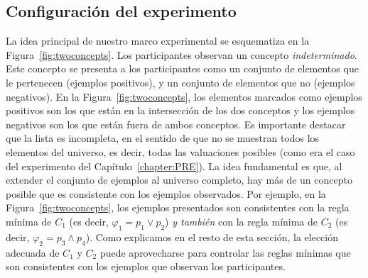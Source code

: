 \subsection{Configuración del experimento}\label{Subsec:ExperimentFlow}
La idea principal de nuestro marco experimental se esquematiza en la Figura~\ref{fig:twoconcepts}. Los participantes observan un concepto \textit{indeterminado}. Este concepto se presenta a los participantes como un conjunto de elementos que le pertenecen (ejemplos positivos), y un conjunto de elementos que no (ejemplos negativos). En la Figura~\ref{fig:twoconcepts}, los elementos marcados como ejemplos positivos son los que están en la intersección de los dos conceptos y los ejemplos negativos son los que están fuera de ambos conceptos. Es importante destacar que la lista es incompleta, en el sentido de que no se muestran todos los elementos del universo, es decir, todas las valuaciones posibles (como era el caso del experimento del Capítulo~\ref{chapter:PRE}). La idea fundamental es que, al extender el conjunto de ejemplos al universo completo, hay más de un concepto posible que es consistente con los ejemplos observados. Por ejemplo, en la Figura~\ref{fig:twoconcepts}, los ejemplos presentados son consistentes con la regla mínima de $C_1$ (es decir, $\varphi_1 = p_1 \lor p_2$) \textit {y también} con la regla mínima de $C_2$ (es decir, $\varphi_2 = p_3 \land p_4$). Como explicamos en el resto de esta sección, la elección adecuada de $C_1$ y $C_2$ puede aprovecharse para controlar las reglas mínimas que son consistentes con los ejemplos que observan los participantes.


